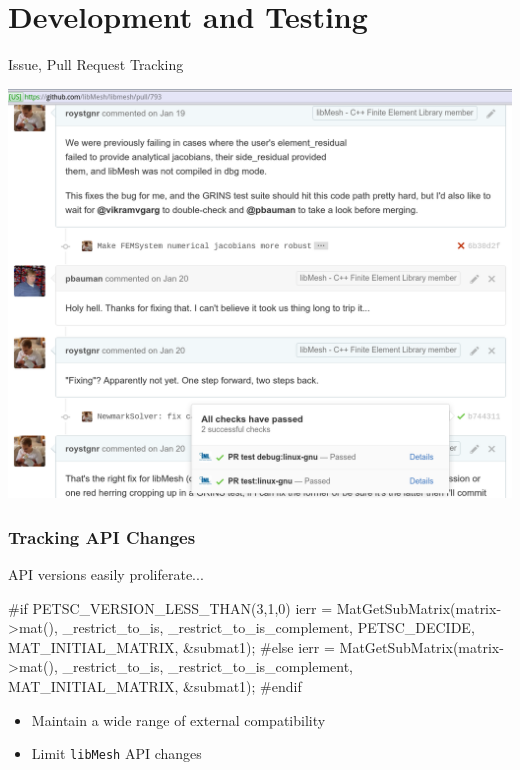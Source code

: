 \documentclass[mathserif]{beamer}
\newcommand{\libMesh}{\texttt{libMesh}\xspace}
\begin{document}
\section{Development and Testing}


\begin{frame}{Issue, Pull Request Tracking}
  \begin{center}
    \includegraphics[width=.8\textwidth]{github_ticket}
  \end{center}
\end{frame}


\begin{frame}[fragile]
\frametitle{Tracking API Changes}

\begin{block}{API versions easily proliferate...}
\small
\begin{semiverbatim}
#if PETSC_VERSION_LESS_THAN(3,1,0)
  ierr = MatGetSubMatrix(matrix->mat(),
           _restrict_to_is, _restrict_to_is_complement,
           \alert{PETSC_DECIDE}, MAT_INITIAL_MATRIX, &submat1);
#else
  ierr = MatGetSubMatrix(matrix->mat(),
           _restrict_to_is, _restrict_to_is_complement,
           MAT_INITIAL_MATRIX, &submat1);
#endif
\end{semiverbatim}
\end{block}

\begin{itemize}
	\item Maintain a wide range of external compatibility
	\item Limit \libMesh{} API changes
\end{itemize}

\end{frame}
\end{document}
